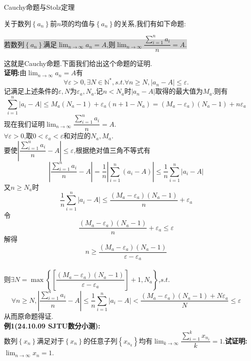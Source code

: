 \documentclass[a4paper,oneside]{ctexart}
\begin{document}
\pagestyle{empty}
\begin{center}
    \large Cauchy命题与Stolz定理
\end{center}
关于数列$\left\{ a_n\right\}$前$n$项的均值与$\left\{ a_n\right\}$的关系,我们有如下命题:
\begin{center}
    \colorbox{lightgray}{若数列$\left\{ a_n\right\}$满足$\lim_{n\to\infty}{a_n}=A$,则$\lim_{n\to\infty}{\dfrac{\sum_{i=1}^{n}{a_i}}{n}}=A$.}
\end{center}
这就是Cauchy命题.下面我们给出这个命题的证明.\\
\textbf{证明:}由$\lim_{n\to\infty}{a_n}=A$有
$$\forall\varepsilon>0,\exists N\in\mathbb{N}^*,s.t.\forall n\geqslant N,\left\lvert a_n-A\right\rvert\leqslant\varepsilon.$$
记满足上述条件的$\varepsilon,N$为$\varepsilon_a,N_a$.记$n<N_a$时$\left\lvert a_n-A\right\rvert$取得的最大值为$M_a$.则有
$$\sum_{i=1}^{n}{\left\lvert a_i-A\right\rvert}\leqslant M_a(N_a-1)+\varepsilon_a(n+1-N_a)=(M_a-\varepsilon_a)(N_a-1)+n\varepsilon_a$$
现在我们证明$\lim_{n\to\infty}{\dfrac{\sum_{i=1}^{n}{a_i}}{n}}=A$.\\
$\forall\varepsilon>0$,取$0<\varepsilon_a<\varepsilon$和对应的$N_a,M_a$.\\
要使$\left\lvert \dfrac{\sum_{i=1}^{n}{a_i}}{n}-A\right\rvert\leqslant\varepsilon$,根据绝对值三角不等式有
$$\left\lvert \dfrac{\sum_{i=1}^{n}{a_i}}{n}-A\right\rvert=\dfrac{1}{n}\left\lvert \sum_{i=1}^{n}{(a_i-A)}\right\rvert\leqslant\dfrac{1}{n}\sum_{i=1}^{n}{\left\lvert a_i-A\right\rvert}$$
又$n\geqslant N_a$时$$\dfrac{1}{n}\sum_{i=1}^{n}{\left\lvert a_i-A\right\rvert}\leqslant\dfrac{(M_a-\varepsilon_a)(N_a-1)}{n}+\varepsilon_a$$
令$$\dfrac{(M_a-\varepsilon_a)(N_a-1)}{n}+\varepsilon_a\leqslant\varepsilon$$
解得$$n\geqslant\dfrac{(M_a-\varepsilon_a)(N_a-1)}{\varepsilon-\varepsilon_a}$$\\
则$\exists N=\max\left\{\left[\dfrac{(M_a-\varepsilon_a)(N_a-1)}{\varepsilon-\varepsilon_a}\right]+1,N_a\right\}$,$s.t.$
$$\forall n\geqslant N,\left\lvert \dfrac{\sum_{i=1}^{n}{a_i}}{n}-A\right\rvert
\leqslant\dfrac{1}{n}\sum_{i=1}^{n}{\left\lvert a_i-A\right\rvert}<\dfrac{(M_a-\varepsilon_a)(N_a-1)+N\varepsilon_a}{N}\leqslant\varepsilon$$
从而原命题得证.\\
\newpage\noindent
\textbf{例1(24.10.09 SJTU数分小测):}\\
数列$\left\{ x_n\right\}$满足对于$\left\{ x_n\right\}$的任意子列$\left\{ x_{n_k}\right\}$均有$\lim_{k\to\infty}{\dfrac{\sum_{i=1}^{k}{x_{n_i}}}{k}}=1$.\textbf{试证明:}$\lim_{n\to\infty}{x_n}=1$.\\
\end{document}
